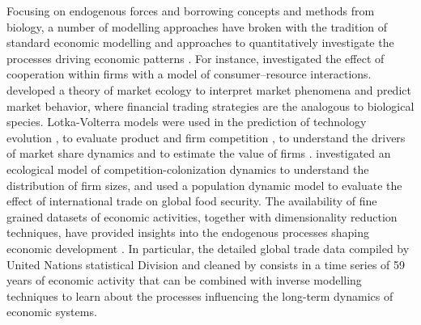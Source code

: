   Focusing on endogenous forces and borrowing concepts and methods from biology, a number of modelling approaches have broken with the tradition of standard economic modelling and approaches to quantitatively investigate the processes driving economic patterns \citep{Tacchella2018}.
  For instance, \cite{Saavedra2009a} investigated the effect of cooperation within firms with a model of consumer–resource interactions. \cite{Scholl2020} developed a theory of market ecology to interpret market phenomena and predict market behavior, where financial trading strategies are the analogous to biological species.
  Lotka-Volterra models were used in the prediction of technology evolution \citep{Zhang2018}, to evaluate product and firm competition \citep{Modis1997,Saavedra2014}, to understand the drivers of market share dynamics \citep{Farmer1999,Michalakelis2011,Marasco2016,Gatabazi2019} and to estimate the value of firms \citep{Cauwels56}.
  \cite{Applegate2021} investigated an ecological model of competition-colonization dynamics to understand the distribution of firm sizes, and \cite{Suweis2015} used a population dynamic model to evaluate the effect of international trade on global food security.
  The availability of fine grained datasets of economic activities, together with dimensionality reduction techniques, have provided insights into the endogenous processes shaping economic development \citep{Mealy2019,Hidalgo2021}.
  In particular, the detailed global trade data compiled by United Nations statistical Division and cleaned by \cite{Hidalgo2021} consists in a time series of 59 years of economic activity that can be combined with inverse modelling techniques to learn about the processes influencing the long-term dynamics of economic systems.
  
